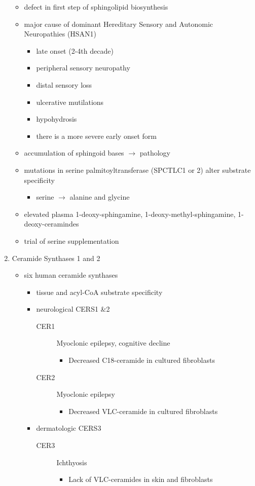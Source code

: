 \documentclass{scrartcl}
\begin{document}
\begin{enumerate}
\begin{itemize}
\item defect in first step of sphingolipid biosynthesis
\item major cause of dominant Hereditary Sensory and Autonomic Neuropathies (HSAN1)
\begin{itemize}
\item late onset (2-4th decade)
\item peripheral sensory neuropathy
\item distal sensory loss
\item ulcerative mutilations
\item hypohydrosis
\item there is a more severe early onset form
\end{itemize}
\item accumulation of sphingoid bases \(\to\) pathology
\item mutations in serine palmitoyltransferase (SPCTLC1 or 2) alter
substrate specificity
\begin{itemize}
\item serine \(\to\) alanine and glycine
\end{itemize}
\item elevated plasma 1-deoxy-sphingamine, 1-deoxy-methyl-sphingamine, 1-deoxy-ceramindes
\item trial of serine supplementation
\end{itemize}

\item Ceramide Synthases 1 and 2
\label{sec:org9562636}

\begin{itemize}
\item six human ceramide synthases
\begin{itemize}
\item tissue and acyl-CoA substrate specificity
\item neurological CERS1 \&2
\begin{description}
\item[{CER1}] Myoclonic epilepsy, cognitive decline
\begin{itemize}
\item Decreased C18-ceramide in cultured fibroblasts
\end{itemize}
\item[{CER2}] Myoclonic epilepsy
\begin{itemize}
\item Decreased VLC-ceramide in cultured fibroblasts
\end{itemize}
\end{description}
\item dermatologic CERS3
\begin{description}
\item[{CER3}] Ichthyosis
\begin{itemize}
\item Lack of VLC-ceramides in skin and fibroblasts
\end{itemize}
\end{description}
\end{itemize}
\end{itemize}


\end{enumerate}
\end{document}
